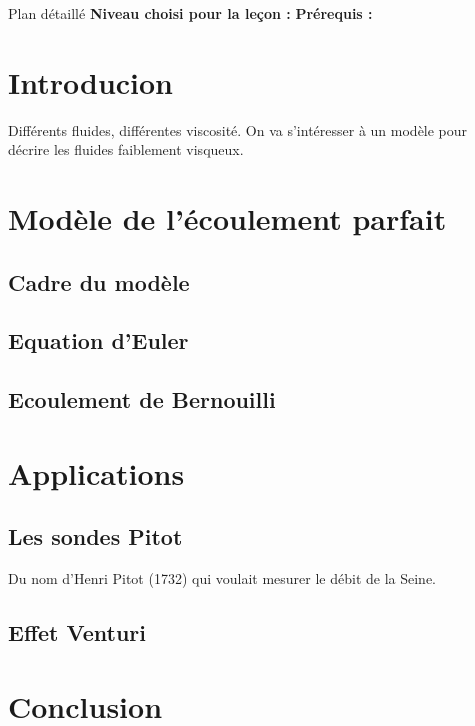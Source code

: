 \begin{reportBlock}{Plan détaillé}
  \textbf{Niveau choisi pour la leçon :} 
  \newline
  \textbf{Prérequis : }
  \newline

\section*{Introducion}
Différents fluides, différentes viscosité. On va s'intéresser à un modèle pour décrire les fluides faiblement visqueux.

\section{Modèle de l'écoulement parfait}


\subsection{Cadre du modèle}
\subsection{Equation d'Euler}
\subsection{Ecoulement de Bernouilli}

\section{Applications}

\subsection{Les sondes Pitot}
Du nom d'Henri Pitot (1732) qui voulait mesurer le débit de la Seine.
\subsection{Effet Venturi}


\section*{Conclusion}


\end{reportBlock}